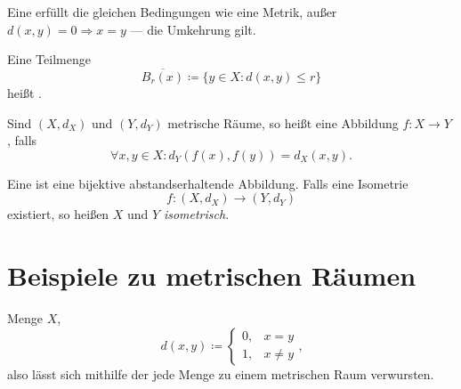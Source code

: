 \begin{definition}[Pseudometrik]\label{def:pseudometrik}
  Eine  erfüllt die gleichen Bedingungen wie eine Metrik, außer \( d(x,y) = 0 \Rightarrow x = y \) --- die Umkehrung gilt.
\end{definition}

\begin{definition}\label{def:abgeschlossenerBall}
  Eine Teilmenge
  \begin{equation*}
    \overline{B_r(x)} \coloneqq \{ y \in X : d(x,y) \leq r \}
  \end{equation*}
  heißt .
\end{definition}

\begin{definition}\label{def:abstandserhaltendeAbbildung}
  Sind \( (X, d_X) \) und \( (Y, d_Y) \) metrische Räume, so heißt eine Abbildung \( f: X \to Y \) , falls
  \begin{equation*}
    \forall x, y \in X: d_Y(f(x), f(y)) = d_X(x, y)\text{.}
  \end{equation*}
\end{definition}

\begin{definition}[Isometrie]\label{def:isometrie}
  Eine  ist eine bijektive abstandserhaltende Abbildung. Falls eine Isometrie
  \begin{equation*}
    f: (X, d_X) \to (Y, d_Y)
  \end{equation*}
  existiert, so heißen \( X \) und \( Y \) \emph{isometrisch}.
\end{definition}

\section{Beispiele zu metrischen Räumen}

\begin{example}\label{bsp:trivialeMetrik}
  Menge \( X \),
  \begin{equation*}
    d(x, y) \coloneqq \begin{cases}
    0, &x = y \\
    1, & x \neq y
  \end{cases}\text{,}
  \end{equation*}
  also lässt sich mithilfe der  jede Menge zu einem metrischen Raum verwursten. 
\end{example}

